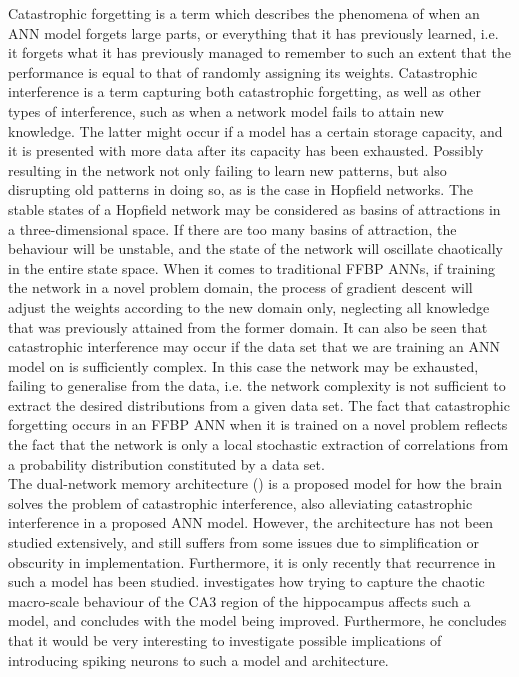Catastrophic forgetting \cite{McCloskey1989} is a term which describes the phenomena of when an ANN model forgets large parts, or everything that it has previously learned, i.e. it forgets what it has previously managed to remember to such an extent that the performance is equal to that of randomly assigning its weights. Catastrophic interference is a term capturing both catastrophic forgetting, as well as other types of interference, such as when a network model fails to attain new knowledge. The latter might occur if a model has a certain storage capacity, and it is presented with more data after its capacity has been exhausted. Possibly resulting in the network not only failing to learn new patterns, but also disrupting old patterns in doing so, as is the case in Hopfield networks. The stable states of a Hopfield network may be considered as basins of attractions in a three-dimensional space. If there are too many basins of attraction, the behaviour will be unstable, and the state of the network will oscillate chaotically in the entire state space.
When it comes to traditional FFBP ANNs, if training the network in a novel problem domain, the process of gradient descent will adjust the weights according to the new domain only, neglecting all knowledge that was previously attained from the former domain.
It can also be seen that catastrophic interference may occur if the data set that we are training an ANN model on is sufficiently complex. In this case the network may be exhausted, failing to generalise from the data, i.e. the network complexity is not sufficient to extract the desired distributions from a given data set. 
The fact that catastrophic forgetting occurs in an FFBP ANN when it is trained on a novel problem reflects the fact that the network is only a local stochastic extraction of correlations from a probability distribution constituted by a data set.
\\

The dual-network memory architecture (\cite{McClelland1995}) is a proposed model for how the brain solves the problem of catastrophic interference, also alleviating catastrophic interference in a proposed ANN model. However, the architecture has not been studied extensively, and still suffers from some issues due to simplification or obscurity in implementation. Furthermore, it is only recently that recurrence in such a model has been studied. \cite{Hattori2014} investigates how trying to capture the chaotic macro-scale behaviour of the CA3 region of the hippocampus affects such a model, and concludes with the model being improved. Furthermore, he concludes that it would be very interesting to investigate possible implications of introducing spiking neurons to such a model and architecture.
\\

